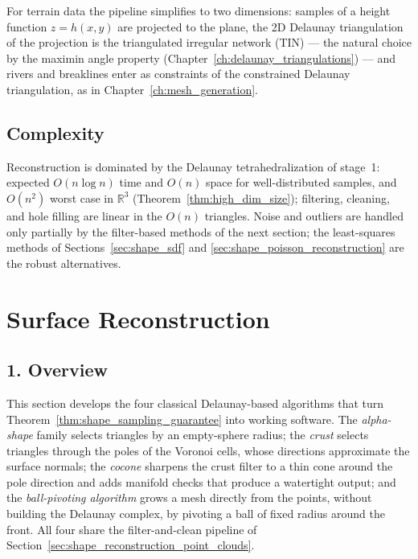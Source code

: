 For terrain data the pipeline simplifies to two dimensions: samples of a height
function $z = h(x, y)$ are projected to the plane, the 2D Delaunay triangulation
of the projection is the triangulated irregular network (TIN) --- the natural
choice by the maximin angle property (Chapter~\ref{ch:delaunay_triangulations})
--- and rivers and breaklines enter as constraints of the constrained Delaunay
triangulation, as in Chapter~\ref{ch:mesh_generation}.

\subsection{Complexity}

Reconstruction is dominated by the Delaunay tetrahedralization of stage~1:
expected $O(n \log n)$ time and $O(n)$ space for well-distributed samples, and
$O(n^2)$ worst case in $\mathbb{R}^3$ (Theorem~\ref{thm:high_dim_size});
filtering, cleaning, and hole filling are linear in the $O(n)$ triangles. Noise
and outliers are handled only partially by the filter-based methods of the next
section; the least-squares methods of Sections~\ref{sec:shape_sdf} and
\ref{sec:shape_poisson_reconstruction} are the robust alternatives.


\section{Surface Reconstruction}
\label{sec:shape_reconstruction_surface}

\subsection{1. Overview}

This section develops the four classical Delaunay-based algorithms that turn
Theorem~\ref{thm:shape_sampling_guarantee} into working software. The
\emph{alpha-shape} family \cite{edelsbrunner1983alpha,edelsbrunner1994}
selects triangles by an empty-sphere radius; the \emph{crust}
\cite{amenta1998,amentabern1999} selects triangles through the poles of the
Voronoi cells, whose directions approximate the surface normals; the
\emph{cocone} \cite{amenta2000} sharpens the crust filter to a thin cone
around the pole direction and adds manifold checks that produce a watertight
output; and the \emph{ball-pivoting algorithm} \cite{bernardini1999} grows a
mesh directly from the points, without building the Delaunay complex, by
pivoting a ball of fixed radius around the front. All four share the
filter-and-clean pipeline of Section~\ref{sec:shape_reconstruction_point_clouds}.

